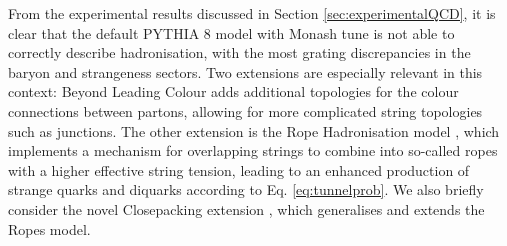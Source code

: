     From the experimental results discussed in Section \ref{sec:experimentalQCD}, it is clear that the default PYTHIA 8 model with Monash tune is not able to correctly describe hadronisation, with the most grating discrepancies in the baryon and strangeness sectors. Two extensions are especially relevant in this context: Beyond Leading Colour \cite{Junctions} adds additional topologies for the colour connections between partons, allowing for more complicated string topologies such as junctions. The other extension is the Rope Hadronisation model \cite{Ropes}, which implements a mechanism for overlapping strings to combine into so-called ropes with a higher effective string tension, leading to an enhanced production of strange quarks and diquarks according to Eq. \ref{eq:tunnelprob}. We also briefly consider the novel Closepacking extension \cite{Closepacking}, which generalises and extends the Ropes model. 

